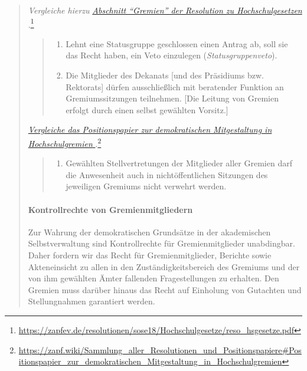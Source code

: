 \documentclass[DIV=14]{scrartcl}
\begin{document}
\begin{quote}
\emph{Vergleiche hierzu }\href{https://zapfev.de/resolutionen/sose18/Hochschulgesetze/reso_hsgesetze.pdf}{\emph{Abschnitt \enquote{Gremien} der Resolution zu Hochschulgesetzen%
  }}.\footnote{\url{https://zapfev.de/resolutionen/sose18/Hochschulgesetze/reso_hsgesetze.pdf}}

\begin{quote}
\begin{enumerate}
\def\labelenumi{\arabic{enumi}.}
\setcounter{enumi}{1}
\item Lehnt eine Statusgruppe geschlossen einen Antrag ab, soll sie das Recht haben, ein Veto einzulegen (\emph{Statusgruppenveto}). %

\item Die Mitglieder des Dekanats {[}und des Präsidiums bzw. Rektorats{]} dürfen ausschließlich mit beratender Funktion an Gremiumssitzungen teilnehmen. {[}Die Leitung von Gremien erfolgt durch einen selbst gewählten Vorsitz.{]}
\end{enumerate}
\end{quote}

\href{https://zapf.wiki/Sammlung_aller_Resolutionen_und_Positionspapiere\#Positionspapier_zur_demokratischen_Mitgestaltung_in_Hochschulgremien}{\emph{Vergleiche das Positionspapier zur demokratischen Mitgestaltung in Hochschulgremien%
  }}.\footnote{\url{https://zapf.wiki/Sammlung_aller_Resolutionen_und_Positionspapiere\#Positionspapier_zur_demokratischen_Mitgestaltung_in_Hochschulgremien}}

\begin{quote}
\begin{enumerate}
\def\labelenumi{\arabic{enumi}.}
\setcounter{enumi}{3}
\item Gewählten Stellvertretungen der Mitglieder aller Gremien darf die Anwesenheit auch in nichtöffentlichen Sitzungen des jeweiligen Gremiums nicht verwehrt werden.
\end{enumerate}
\end{quote}

\hypertarget{kontrollrechte-von-gremienmitgliedern}{%
\paragraph{Kontrollrechte von Gremienmitgliedern}\label{kontrollrechte-von-gremienmitgliedern}}

Zur Wahrung der demokratischen Grundsätze in der akademischen Selbstverwaltung sind Kontrollrechte für Gremienmitglieder unabdingbar. Daher fordern wir das Recht für Gremienmitglieder, Berichte sowie Akteneinsicht zu allen in den Zuständigkeitsbereich des Gremiums und der von ihm gewählten Ämter fallenden Fragestellungen zu erhalten. Den Gremien muss darüber hinaus das Recht auf Einholung von Gutachten und Stellungnahmen garantiert werden.


\end{quote}
\end{document}
